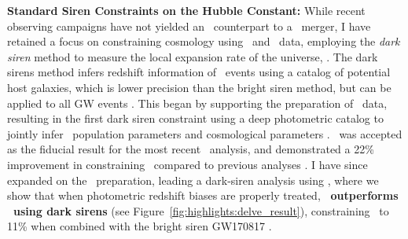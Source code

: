 \textbf{Standard Siren Constraints on the Hubble Constant:}
While recent observing campaigns have not yielded an \EM\ counterpart to a \GW\ merger, I have retained a focus on constraining cosmology using \EM\ and \GW\ data, employing the \textit{dark siren} method to measure the local expansion rate of the universe, \Ho. 
The dark sirens method infers redshift information of \GW\ events using a catalog of potential host galaxies, which is lower precision than the bright siren method, but can be applied to all GW events \cite{2023JCAP...12..023G}.
This began by supporting the preparation of \DES\ data, resulting in the first dark siren constraint using a deep photometric catalog to jointly infer \GW\ population parameters and cosmological parameters \citep{McMahon2026DESY6H0}. \DES\ was accepted as the fiducial result for the most recent \LVK\ analysis, and demonstrated a 22\% improvement in constraining \Ho\ compared to previous analyses \citep{LVK2026GWTC5}. I have since expanded on the \DES\ preparation, leading a dark-siren analysis using \DELVE, where we show that when photometric redshift biases are properly treated, \textbf{\DELVE\ outperforms \DES\ using dark sirens} (see Figure~\ref{fig:highlights:delve_result}), constraining \Ho\ to 11\% when combined with the bright siren GW170817 \citep{MacBride2026DELVEH0}. %
